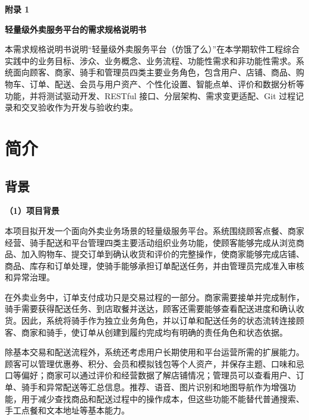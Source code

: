 \renewcommand{\thesection}{\arabic{section}}
\renewcommand{\thesubsection}{\thesection.\arabic{subsection}}
\renewcommand{\thesubsubsection}{\thesubsection.\arabic{subsubsection}}
\setcounter{section}{0}
\setcounter{figure}{0}
\setcounter{table}{0}

\begin{flushright}
{\hei\yihao\textbf{附录 1}}
\end{flushright}

\begin{flushright}
{\hei\sanhao\textbf{轻量级外卖服务平台的需求规格说明书}}
\end{flushright}
\vspace{0.8em}

本需求规格说明书说明“轻量级外卖服务平台（仿饿了么）”在本学期软件工程综合实践中的业务目标、涉众、业务概念、业务流程、功能性需求和非功能性需求。系统面向顾客、商家、骑手和管理员四类主要业务角色，包含用户、店铺、商品、购物车、订单、配送、会员与用户资产、个性化设置、智能点单、评价和数据分析等功能，并将测试驱动开发、RESTful 接口、分层架构、需求变更适配、Git 过程记录和交叉验收作为开发与验收约束。

\section{简介}

\subsection{背景}

\textbf{（1）项目背景}

本项目拟开发一个面向外卖业务场景的轻量级服务平台。系统围绕顾客点餐、商家经营、骑手配送和平台管理四类主要活动组织业务功能，使顾客能够完成从浏览商品、加入购物车、提交订单到确认收货和评价的完整操作，使商家能够完成店铺、商品、库存和订单处理，使骑手能够承担订单配送任务，并由管理员完成准入审核和异常治理。

在外卖业务中，订单支付成功只是交易过程的一部分。商家需要接单并完成制作，骑手需要获得配送任务、到店取餐并送达，顾客还需要能够查看配送进度和确认收货。因此，系统将骑手作为独立业务角色，并以订单和配送任务的状态流转连接顾客、商家和骑手，使订单从创建到履约完成均有明确的责任角色和状态依据。

除基本交易和配送流程外，系统还考虑用户长期使用和平台运营所需的扩展能力。顾客可以管理优惠券、积分、会员和模拟钱包等个人资产，并保存主题、口味和忌口等偏好；商家可以通过评价和经营数据了解店铺情况；管理员可以查看用户、订单、骑手和异常配送等汇总信息。推荐、语音、图片识别和地图导航作为增强功能，用于减少查找商品和配送过程中的操作成本，但这些功能不能替代普通搜索、手工点餐和文本地址等基本能力。

